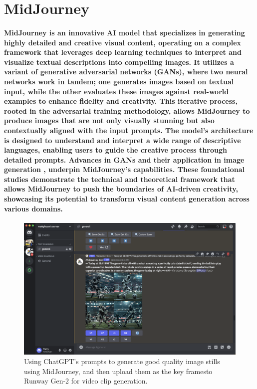 \documentclass[11pt,a4paper,oneside]{report}
\begin{document}
\section{MidJourney}
\paragraph{MidJourney is an innovative AI model that specializes in generating highly detailed and creative visual content, operating on a complex framework that leverages deep learning techniques to interpret and visualize textual descriptions into compelling images. It utilizes a variant of generative adversarial networks (GANs), where two neural networks work in tandem; one generates images based on textual input, while the other evaluates these images against real-world examples to enhance fidelity and creativity. This iterative process, rooted in the adversarial training methodology, allows MidJourney to produce images that are not only visually stunning but also contextually aligned with the input prompts. The model's architecture is designed to understand and interpret a wide range of descriptive languages, enabling users to guide the creative process through detailed prompts. Advances in GANs and their application in image generation \cite{goodfellow2014generative} \cite{karras2019style}, underpin MidJourney's capabilities. These foundational studies demonstrate the technical and theoretical framework that allows MidJourney to push the boundaries of AI-driven creativity, showcasing its potential to transform visual content generation across various domains.}

\begin{figure}[htbp]
  \centering
  \includegraphics[width=\textwidth]{mj.png}
  \caption{Using ChatGPT's prompts to generate good quality image stills using MidJourney, and then upload them as the key framesto Runway Gen-2 for video clip generation.}
\end{figure}
\end{document}
